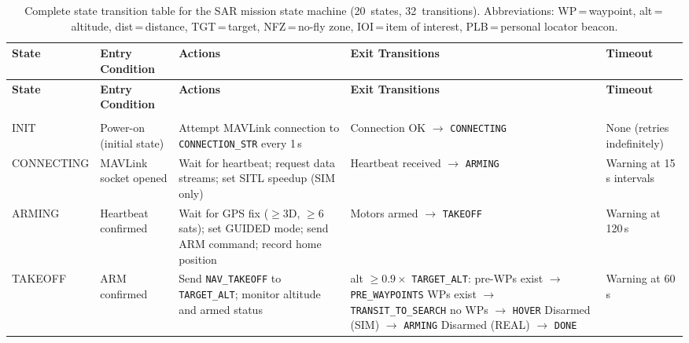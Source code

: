\begin{small}
\setlength{\LTpre}{6pt}
\setlength{\LTpost}{6pt}
\begin{longtable}{
  @{}
  >{\ttfamily\raggedright}p{2.6cm}
  p{3.0cm}
  p{3.2cm}
  p{3.8cm}
  >{\raggedright\arraybackslash}p{2.2cm}
  @{}
}
\caption{Complete state transition table for the SAR mission state machine
(20~states, 32~transitions). Abbreviations: WP\,=\,waypoint, alt\,=\,altitude,
dist\,=\,distance, TGT\,=\,target, NFZ\,=\,no-fly zone, IOI\,=\,item of interest,
PLB\,=\,personal locator beacon.}
\label{tab:state-transitions} \\
\toprule
\textbf{State} & \textbf{Entry Condition} & \textbf{Actions} & \textbf{Exit Transitions} & \textbf{Timeout} \\
\midrule
\endfirsthead

\toprule
\textbf{State} & \textbf{Entry Condition} & \textbf{Actions} & \textbf{Exit Transitions} & \textbf{Timeout} \\
\midrule
\endhead

\midrule
\multicolumn{5}{r}{\emph{Continued on next page}} \\
\endfoot

\bottomrule
\endlastfoot


INIT &
  Power-on (initial state) &
  Attempt MAVLink connection to \texttt{CONNECTION\_STR} every 1\,s &
  Connection OK $\to$ \texttt{CONNECTING} &
  None (retries indefinitely) \\
\addlinespace

CONNECTING &
  MAVLink socket opened &
  Wait for heartbeat; request data streams; set SITL speedup (SIM only) &
  Heartbeat received $\to$ \texttt{ARMING} &
  Warning at 15\,s intervals \\
\addlinespace

ARMING &
  Heartbeat confirmed &
  Wait for GPS fix ($\geq$3D, $\geq$6 sats); set GUIDED mode; send ARM command; record home position &
  Motors armed $\to$ \texttt{TAKEOFF} &
  Warning at 120\,s \\
\addlinespace

TAKEOFF &
  ARM confirmed &
  Send \texttt{NAV\_TAKEOFF} to \texttt{TARGET\_ALT}; monitor altitude and armed status &
  alt $\geq 0.9 \times$ \texttt{TARGET\_ALT}: \newline
  \quad pre-WPs exist $\to$ \texttt{PRE\_WAYPOINTS} \newline
  \quad WPs exist $\to$ \texttt{TRANSIT\_TO\_SEARCH} \newline
  \quad no WPs $\to$ \texttt{HOVER} \newline
  Disarmed (SIM) $\to$ \texttt{ARMING} \newline
  Disarmed (REAL) $\to$ \texttt{DONE} &
  Warning at 60\,s \\


\end{longtable}
\end{small}
